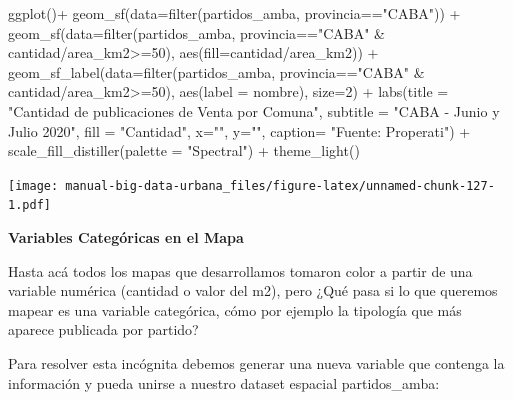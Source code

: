 \documentclass[
  spanish,
]{book}
\newenvironment{Shaded}{\begin{snugshade}}{\end{snugshade}}
\newcommand{\AttributeTok}[1]{\textcolor[rgb]{0.77,0.63,0.00}{#1}}
\newcommand{\DecValTok}[1]{\textcolor[rgb]{0.00,0.00,0.81}{#1}}
\newcommand{\FunctionTok}[1]{\textcolor[rgb]{0.00,0.00,0.00}{#1}}
\newcommand{\NormalTok}[1]{#1}
\newcommand{\SpecialCharTok}[1]{\textcolor[rgb]{0.00,0.00,0.00}{#1}}
\newcommand{\StringTok}[1]{\textcolor[rgb]{0.31,0.60,0.02}{#1}}
\begin{document}
\begin{Shaded}
\begin{Highlighting}[]
\FunctionTok{ggplot}\NormalTok{()}\SpecialCharTok{+}
  \FunctionTok{geom\_sf}\NormalTok{(}\AttributeTok{data=}\FunctionTok{filter}\NormalTok{(partidos\_amba, provincia}\SpecialCharTok{==}\StringTok{"CABA"}\NormalTok{)) }\SpecialCharTok{+}
  \FunctionTok{geom\_sf}\NormalTok{(}\AttributeTok{data=}\FunctionTok{filter}\NormalTok{(partidos\_amba, provincia}\SpecialCharTok{==}\StringTok{"CABA"} \SpecialCharTok{\&}\NormalTok{ cantidad}\SpecialCharTok{/}\NormalTok{area\_km2}\SpecialCharTok{\textgreater{}=}\DecValTok{50}\NormalTok{), }\FunctionTok{aes}\NormalTok{(}\AttributeTok{fill=}\NormalTok{cantidad}\SpecialCharTok{/}\NormalTok{area\_km2)) }\SpecialCharTok{+}
  \FunctionTok{geom\_sf\_label}\NormalTok{(}\AttributeTok{data=}\FunctionTok{filter}\NormalTok{(partidos\_amba, provincia}\SpecialCharTok{==}\StringTok{"CABA"} \SpecialCharTok{\&}\NormalTok{ cantidad}\SpecialCharTok{/}\NormalTok{area\_km2}\SpecialCharTok{\textgreater{}=}\DecValTok{50}\NormalTok{), }\FunctionTok{aes}\NormalTok{(}\AttributeTok{label =}\NormalTok{ nombre), }\AttributeTok{size=}\DecValTok{2}\NormalTok{) }\SpecialCharTok{+}
    \FunctionTok{labs}\NormalTok{(}\AttributeTok{title =} \StringTok{"Cantidad de publicaciones de Venta por Comuna"}\NormalTok{,}
         \AttributeTok{subtitle =} \StringTok{"CABA {-} Junio y Julio 2020"}\NormalTok{,}
         \AttributeTok{fill =} \StringTok{"Cantidad"}\NormalTok{,}
         \AttributeTok{x=}\StringTok{""}\NormalTok{,}
         \AttributeTok{y=}\StringTok{""}\NormalTok{,}
         \AttributeTok{caption=} \StringTok{"Fuente: Properati"}\NormalTok{) }\SpecialCharTok{+}
  \FunctionTok{scale\_fill\_distiller}\NormalTok{(}\AttributeTok{palette =} \StringTok{"Spectral"}\NormalTok{) }\SpecialCharTok{+}
  \FunctionTok{theme\_light}\NormalTok{()}
\end{Highlighting}
\end{Shaded}

\texttt{[image: manual-big-data-urbana\_files/figure-latex/unnamed-chunk-127-1.pdf]}

\textbf{Variables Categóricas en el Mapa}

Hasta acá todos los mapas que desarrollamos tomaron color a partir de una variable numérica (cantidad o valor del m2), pero ¿Qué pasa si lo que queremos mapear es una variable categórica, cómo por ejemplo la tipología que más aparece publicada por partido?

Para resolver esta incógnita debemos generar una nueva variable que contenga la información y pueda unirse a nuestro dataset espacial partidos\_amba:
\end{document}
